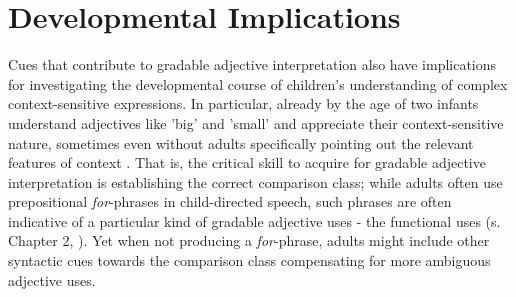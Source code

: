 \section{Developmental Implications}
Cues that contribute to gradable adjective interpretation also have implications for investigating the developmental course of children's understanding of complex context-sensitive expressions. In particular, already by the age of two infants understand adjectives like 'big' and 'small' and appreciate their context-sensitive nature, sometimes even without adults specifically pointing out the relevant features of context \parencite{Mintz2002, ebeling1994children}. That is, the critical skill to acquire for gradable adjective interpretation is establishing the correct comparison class; while adults often use prepositional \emph{for}-phrases in child-directed speech, such phrases are often indicative of a particular kind of gradable adjective uses - the functional uses (s. Chapter 2, \textcite{ebeling1994children}). Yet when not producing a \emph{for}-phrase, adults might include other syntactic cues towards the comparison class compensating for more ambiguous adjective uses. 


